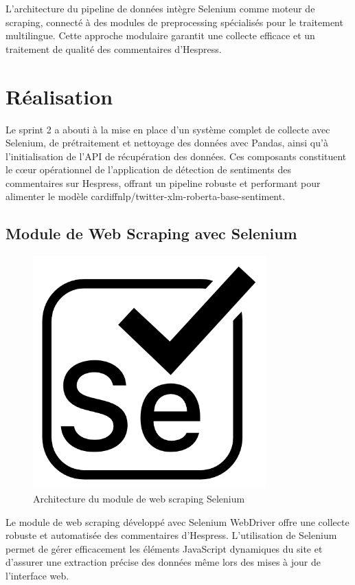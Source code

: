 L'architecture du pipeline de données intègre Selenium comme moteur de scraping, connecté à des modules de preprocessing spécialisés pour le traitement multilingue. Cette approche modulaire garantit une collecte efficace et un traitement de qualité des commentaires d'Hespress.

\section{Réalisation}

Le sprint 2 a abouti à la mise en place d'un système complet de collecte avec Selenium, de prétraitement et nettoyage des données avec Pandas, ainsi qu'à l'initialisation de l'API de récupération des données. Ces composants constituent le cœur opérationnel de l'application de détection de sentiments des commentaires sur Hespress, offrant un pipeline robuste et performant pour alimenter le modèle cardiffnlp/twitter-xlm-roberta-base-sentiment.

\subsection{Module de Web Scraping avec Selenium}

\begin{figure}[H]
\centering
\includegraphics[width=0.8\textwidth]{assets/images/selenium.png}
\caption{Architecture du module de web scraping Selenium}
\label{fig:selenium-scraping}
\end{figure}

Le module de web scraping développé avec Selenium WebDriver offre une collecte robuste et automatisée des commentaires d'Hespress. L'utilisation de Selenium permet de gérer efficacement les éléments JavaScript dynamiques du site et d'assurer une extraction précise des données même lors des mises à jour de l'interface web.

